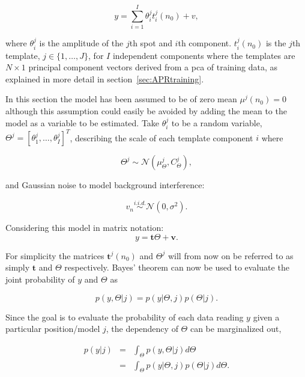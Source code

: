 \begin{equation}\label{eq:mod1}
y = \sum_{i=1}^{I} \theta_i^j t_i^j(n_0) + v,
\end{equation}

where $\theta_i^j$ is the amplitude of the $j$th spot and $i$th component. $t_i^j(n_0)$ is the $j$th template, $j \in \{1, \ldots ,J\}$, for $I$ independent components where the templates are $N \times 1$ principal component vectors derived from a \DIFdelbegin {}\DIFdelend \DIFaddbegin \gls{pca} \DIFaddend of training data, as explained in more detail in section~\ref{sec:APRtraining}.

In this section the model has been assumed to be of zero mean $\mu^j(n_0) =0$ although this assumption could easily be avoided by adding the mean to the model as a variable to be estimated. Take $\theta_i^j$ to be a random variable, $\Theta^j = [\theta_1^j,\ldots,\theta_I^j]^T$, describing the scale of each template component $i$ where

\begin{equation}\label{eq:theta}
\Theta^j \sim \mathcal{N}(\mu_{\Theta}^j,C_{\Theta}^j),
\end{equation}

and Gaussian noise to model background interference:

\begin{equation}\label{eq:noisePCA}
v_n \stackrel{i.i.d.}{\sim} \mathcal{N}(0,\sigma^2).
\end{equation}

Considering this model in matrix notation:
\begin{equation}\label{eq:mod2PCA}
y = \textbf{t}\Theta + \textbf{v}.
\end{equation}

For simplicity the matrices $\textbf{t}^j(n_0)$ and $\Theta^j$ will from now on be referred to as simply $\textbf{t}$ and $\Theta$ respectively.
Bayes' theorem can now be used to evaluate the joint probability of $y$ and $\Theta$ as

\begin{equation}\label{eq:bayes1}
p(y,\Theta | j) = p(y|\Theta,j)p(\Theta | j).
\end{equation}

Since the goal is to evaluate the probability of each data reading $y$ given a particular position/model $j$, the dependency of $\Theta$ can be marginalized out,

\begin{eqnarray}\nonumber
p(y|j) &=& \int_\Theta p(y,\Theta|j) d\Theta \\
\label{eq:marg1} &=& \int_\Theta p(y|\Theta,j)p(\Theta|j) d\Theta.
\end{eqnarray}

